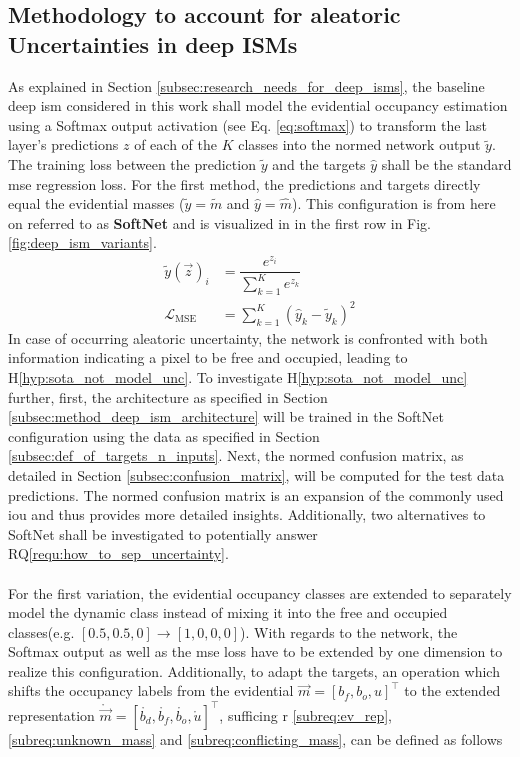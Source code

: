 \subsection{Methodology to account for aleatoric Uncertainties in deep ISMs}
\label{subsec:method_al_uncert_in_deep_isms}
As explained in Section \ref{subsec:research_needs_for_deep_isms}, the baseline deep \gls{ism} considered in this work shall model the evidential occupancy estimation using a Softmax output activation (see Eq. \ref{eq:softmax}) to transform the last layer's predictions $z$ of each of the $K$ classes into the normed network output $\tilde{y}$. The training loss between the prediction $\tilde{y}$ and the targets $\hat{y}$ shall be the standard \gls{mse} regression loss. For the first method, the predictions and targets directly equal the evidential masses ($\tilde{y} = \tilde{m}$ and $\hat{y} = \hat{m}$). This configuration is from here on referred to as \textbf{SoftNet} and is visualized in in the first row in Fig. \ref{fig:deep_ism_variants}. 
\begin{align}
	\label{eq:softmax}
	\tilde{y}(\vec{z})_i &= \dfrac{e^{z_i}}{\sum_{k=1}^{K}e^{z_k}}\\
	\label{eq:mse}
	\mathcal{L}_{\text{MSE}} &= \sum_{k=1}^{K}(\hat{y}_k - \tilde{y}_k)^2
\end{align}
In case of occurring aleatoric uncertainty, the network is confronted with both information indicating a pixel to be free and occupied, leading to H\ref{hyp:sota_not_model_unc}. To investigate H\ref{hyp:sota_not_model_unc} further, first, the architecture as specified in Section \ref{subsec:method_deep_ism_architecture} will be trained in the SoftNet configuration using the data as specified in Section \ref{subsec:def_of_targets_n_inputs}. Next, the normed confusion matrix, as detailed in Section \ref{subsec:confusion_matrix}, will be computed for the test data predictions. The normed confusion matrix is an expansion of the commonly used \gls{iou} and thus provides more detailed insights. Additionally, two alternatives to SoftNet shall be investigated to potentially answer RQ\ref{requ:how_to_sep_uncertainty}. 
\\\\
For the first variation, the evidential occupancy classes are extended to separately model the dynamic class instead of mixing it into the free and occupied classes(e.g. $[0.5, 0.5,0] \rightarrow [1,0,0,0]$). With regards to the network, the Softmax output as well as the \gls{mse} loss have to be extended by one dimension to realize this configuration. Additionally, to adapt the targets, an operation which shifts the occupancy labels from the evidential $\vec{m}=[b_f,b_o,u]^\top$ to the extended representation $\mathring{\vec{m}}=[\mathring{b_d},\mathring{b_f},\mathring{b_o},\mathring{u}]^\top$, sufficing \gls{r} \ref{subreq:ev_rep}, \ref{subreq:unknown_mass} and \ref{subreq:conflicting_mass}, can be defined as follows
